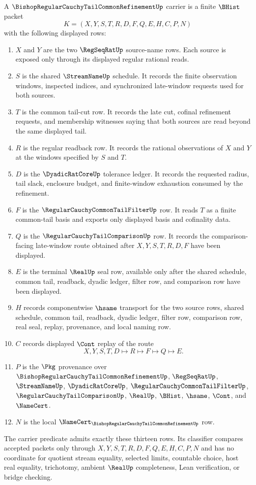 \begin{definition}
\label{def:bishop-regular-cauchy-tail-common-refinement-carrier}
A $\BishopRegularCauchyTailCommonRefinementUp$ carrier is a finite $\BHist$ packet
$$
K=(X,Y,S,T,R,D,F,Q,E,H,C,P,N)
$$
with the following displayed rows:
\begin{enumerate}
\item $X$ and $Y$ are the two $\RegSeqRatUp$ source-name rows. Each source is exposed only through its displayed regular rational reads.
\item $S$ is the shared $\StreamNameUp$ schedule. It records the finite observation windows, inspected indices, and synchronized late-window requests used for both sources.
\item $T$ is the common tail-cut row. It records the late cut, cofinal refinement requests, and membership witnesses saying that both sources are read beyond the same displayed tail.
\item $R$ is the regular readback row. It records the rational observations of $X$ and $Y$ at the windows specified by $S$ and $T$.
\item $D$ is the $\DyadicRatCoreUp$ tolerance ledger. It records the requested radius, tail slack, enclosure budget, and finite-window exhaustion consumed by the refinement.
\item $F$ is the $\RegularCauchyCommonTailFilterUp$ row. It reads $T$ as a finite common-tail basis and exports only displayed basis and cofinality data.
\item $Q$ is the $\RegularCauchyTailComparisonUp$ row. It records the comparison-facing late-window route obtained after $X,Y,S,T,R,D,F$ have been displayed.
\item $E$ is the terminal $\RealUp$ seal row, available only after the shared schedule, common tail, readback, dyadic ledger, filter row, and comparison row have been displayed.
\item $H$ records componentwise $\hsame$ transport for the two source rows, shared schedule, common tail, readback, dyadic ledger, filter row, comparison row, real seal, replay, provenance, and local naming row.
\item $C$ records displayed $\Cont$ replay of the route
$$
X,Y,S,T,D \longmapsto R \longmapsto F \longmapsto Q \longmapsto E .
$$
\item $P$ is the $\Pkg$ provenance over $\BishopRegularCauchyTailCommonRefinementUp$, $\RegSeqRatUp$, $\StreamNameUp$, $\DyadicRatCoreUp$, $\RegularCauchyCommonTailFilterUp$, $\RegularCauchyTailComparisonUp$, $\RealUp$, $\BHist$, $\hsame$, $\Cont$, and $\NameCert$.
\item $N$ is the local $\NameCert_{\BishopRegularCauchyTailCommonRefinementUp}$ row.
\end{enumerate}
The carrier predicate admits exactly these thirteen rows. Its classifier compares accepted packets only through $X,Y,S,T,R,D,F,Q,E,H,C,P,N$ and has no coordinate for quotient stream equality, selected limits, countable choice, host real equality, trichotomy, ambient $\RealUp$ completeness, Lean verification, or bridge checking.
\end{definition}

